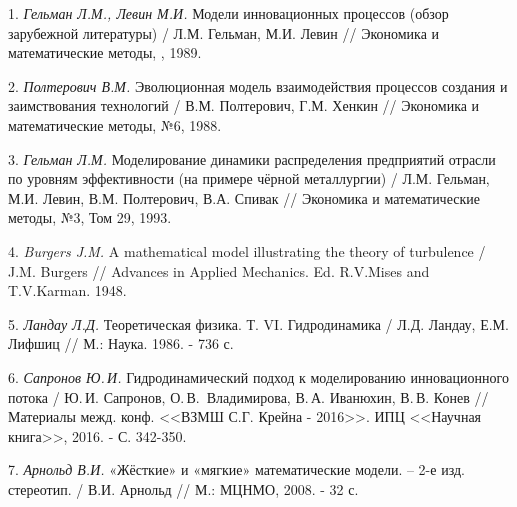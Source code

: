 \litlist

1. {\it Гельман Л.М., Левин М.И.} Модели инновационных процессов (обзор
зарубежной литературы) / Л.М. Гельман,  М.И. Левин // Экономика и
математические методы, , 1989.

2. {\it Полтерович В.М.} Эволюционная модель взаимодействия процессов
создания и заимствования технологий /
\linebreak
В.М. Полтерович, Г.М. Хенкин
// Экономика и математические методы, №6, 1988.

3. {\it Гельман Л.М.} Моделирование динамики распределения предприятий
отрасли по уровням эффективности (на примере чёрной металлургии) /
Л.М. Гельман, М.И. Левин, В.М. Полтерович, В.А. Спивак // Экономика
и математические методы, №3, Том 29, 1993.


4. {\it Burgers J.M.} A mathematical model illustrating the theory of
turbulence / J.M. Burgers // Advances in Applied Mechanics. Ed.
R.V.Mises and T.V.Karman. 1948.


5. {\it Ландау Л.Д.} Теоретическая физика. Т. VI. Гидродинамика / Л.Д.
Ландау, Е.М. Лифшиц //  М.: Наука. 1986. - 736 с.

6. {\it Сапронов Ю.\,И.} Гидродинамический подход к моделированию
инновационного потока / Ю.\,И. Сапронов,
\linebreak
О.\,В.~Владимирова, В.\,А.
Иванюхин, В.\,В. Конев // Материалы межд. конф. <<ВЗМШ С.Г. Крейна -
2016>>. ИПЦ <<Научная книга>>, 2016. - С. 342-350.

7. {\it Арнольд В.И.} «Жёсткие» и «мягкие» математические модели. – 2-е
изд. стереотип. / В.И. Арнольд // М.: МЦНМО, 2008. - 32 с.
